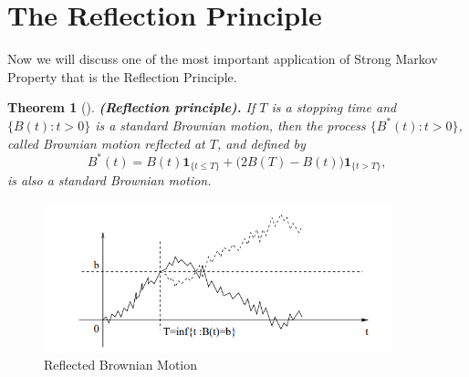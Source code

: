 \documentclass[11pt, a4paper, oneside]{report}
\numberwithin{equation}{section}
\newtheorem{theorem}{Theorem}[chapter]
\begin{document}
\section{The Reflection Principle}
Now we will discuss one of the most important application of Strong Markov Property that is the Reflection Principle.
\begin{theorem}[{\cite[Theorem 2.19]{PeresMortersBook}}]
\textbf{(Reflection principle).} If \(T\) is a stopping time and \(\{B(t) : t > 0\}\) is a standard Brownian motion, then the process \(\{B^*(t) : t > 0\}\), called \emph{Brownian motion reflected at \(T\)}, and defined by
\[
B^*(t) = B(t)\mathbf{1}_{\{t \leq T\}} + \big(2B(T) - B(t)\big)\mathbf{1}_{\{t > T\}},
\]
is also a standard Brownian motion.
\end{theorem}
\begin{figure}[htbp]
    \centering
    \includegraphics[width=0.9\textwidth]{Screenshot 2025-07-08 162659.png}
    \caption{Reflected Brownian Motion}
\end{figure}
\end{document}

